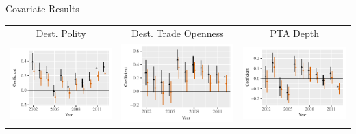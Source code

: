 \documentclass{beamer}
\begin{document}
\begin{frame}{Covariate Results}
\begin{tabular}{c@{\hskip -.4cm}c@{\hskip -.4cm}c}
Dest. Polity & Dest. Trade Openness & PTA Depth \\ 
\includegraphics[height=.3\textheight, clip=true, trim=.5cm .5cm 0cm .1cm]{slides_figures/rl_plots/DestPolity.pdf} 
 &
\includegraphics[height=.3\textheight, clip=true, trim=.5cm .5cm 0cm .1cm]{slides_figures/rl_plots/DestTO.pdf}   &
\includegraphics[height=.3\textheight, clip=true, trim=.5cm .5cm 0cm .1cm]{slides_figures/rl_plots/PTAdepth.pdf} \\  
\end{tabular}



\end{frame}
\end{document}
